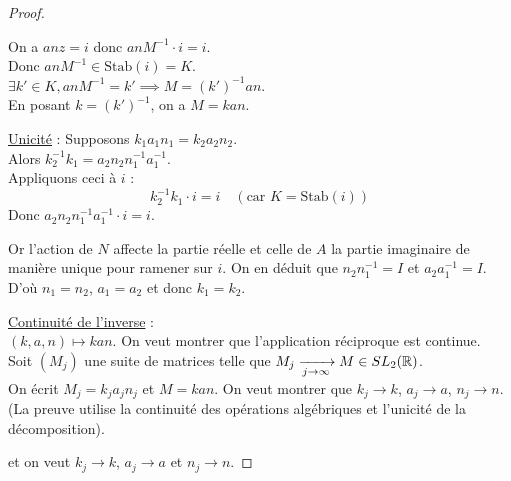 \begin{proof}
\begin{center}
    \end{center}

    On a $a n z = i$ donc $a n M^{-1} \cdot i = i$. \\
    Donc $a n M^{-1} \in \text{Stab}(i) = K$. \\
    $\exists k' \in K, a n M^{-1} = k' \implies M = (k')^{-1} a n$. \\
    En posant $k = (k')^{-1}$, on a $M = k a n$.

    \uline{Unicité} : Supposons $k_1 a_1 n_1 = k_2 a_2 n_2$. \\
    Alors $k_2^{-1} k_1 = a_2 n_2 n_1^{-1} a_1^{-1}$. \\
    Appliquons ceci à $i$ :
    \[ k_2^{-1} k_1 \cdot i = i \quad (\text{car } K = \text{Stab}(i)) \]
    Donc $a_2 n_2 n_1^{-1} a_1^{-1} \cdot i = i$.
    
    Or l'action de $N$ affecte la partie réelle et celle de $A$ la partie imaginaire de manière unique pour ramener sur $i$.
    On en déduit que $n_2 n_1^{-1} = I$ et $a_2 a_1^{-1} = I$.
    D'où $n_1 = n_2$, $a_1 = a_2$ et donc $k_1 = k_2$.

    \uline{Continuité de l'inverse} : \\
    $(k, a, n) \mapsto kan$. On veut montrer que l'application réciproque est continue. \\
    Soit $(M_j)$ une suite de matrices telle que $M_j \xrightarrow[j \to \infty]{} M \in SL_2(\mathbb{R})$. \\
    On écrit $M_j = k_j a_j n_j$ et $M = k a n$. On veut montrer que $k_j \to k$, $a_j \to a$, $n_j \to n$. \\
    (La preuve utilise la continuité des opérations algébriques et l'unicité de la décomposition).

et on veut $k_j \to k$, $a_j \to a$ et $n_j \to n$.


\end{proof}
